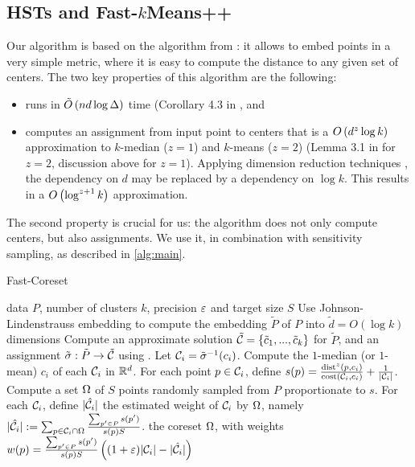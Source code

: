\subsection{HSTs and Fast-$k$Means++}
Our algorithm is based on the \fkmeans algorithm from \cite{cohen2020fast}: it allows to embed points in a very simple metric,  where it is easy to compute the
distance to any given set of centers. The two key properties of this algorithm are the following: 
\begin{itemize}
\item \fkmeans runs in $\tilde O\left( n d \log \Delta\right)$ time (Corollary 4.3 in \cite{cohen2020fast}, and
\item \fkmeans computes an assignment from input point to centers that is a $O\left( d^z \log k\right)$ approximation to $k$-median ($z=1$) and
$k$-means ($z=2$) (Lemma 3.1 in \cite{cohen2020fast} for $z=2$, discussion above for $z=1$). Applying dimension reduction techniques \cite{MakarychevMR19}, the dependency on $d$ may be replaced by a dependency on $\log k$. This results in a $O\left(\log^{z+1} k\right)$ approximation.
\end{itemize}

The second property is crucial for us: the algorithm does not only compute centers, but also assignments. 
  We use it, in combination with sensitivity sampling, as described in \cref{alg:main}.


\begin{algorithm}[tb]
   \caption{Fast-Coreset}
   \label{alg:main}
\begin{algorithmic}[1]
    data $P$, number of clusters $k$, precision $\varepsilon$ and target size $S$
   \State Use Johnson-Lindenstrauss embedding to compute the embedding $\tilde P$ of $P$ into $\tilde d = O(\log k)$ dimensions
   \State Compute an approximate solution $\tilde {\mathcal C} = \left\{ \tilde c_1, ..., \tilde c_k\right\} $ for $\tilde P$, and an assignment $\tilde \sigma : \tilde P \rightarrow \tilde {\mathcal C}$ using \fkmeans.	
   \State Let $\mathcal C_i = \tilde \sigma^{-1}(c_i)$.
   \State Compute the $1$-median (or $1$-mean) $c_i$ of each $\mathcal C_i$ in $\mathbb{R}^d$.%
   \State For each point $p \in \mathcal C_i$, define
   $s(p) = \frac{\operatorname{dist}^z(p, c_i)}{\operatorname{cost}(\mathcal C_i, c_i)}+ \frac{1}{|\mathcal C_i|}$.
   \State Compute a set $\Omega$ of $S$ points randomly sampled from $P$ proportionate to $s$.
   \State For each $\mathcal C_i$, define $|\hat {\mathcal C}_i|$ the estimated weight of $\mathcal C_i$ by $\Omega$, namely $|\hat {\mathcal C}_i| := \sum_{p \in \mathcal C_i \cap \Omega} \frac{\sum_{p' \in P}s(p')}{s(p)S}$.
    the coreset $\Omega$, with weights $w(p) = \frac{\sum_{p' \in P}s(p')}{s(p)S} \left( (1+\varepsilon)|\mathcal C_i| - |\hat {\mathcal C}_i|\right)$
\end{algorithmic}
\end{algorithm}

